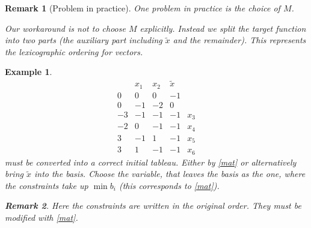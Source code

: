 \documentclass{article}
\numberwithin{lecref}{section}
\newtheorem*{Example}{Example}
\newtheorem*{Remark}{Remark}
\begin{document}
\begin{Remark}[Problem in practice]
	One problem in practice is the choice of $M$.

	Our workaround is not to choose $M$ explicitly. Instead we split the target function into two parts (the auxiliary part including $\tilde x$ and the remainder).
	This represents the lexicographic ordering for vectors.
\end{Remark}

\begin{Example}
	\[
		\begin{array}{c|cccr}
			& x_1 & x_2 & \tilde x & \\
			0 & 0 & 0 & -1 & \\
			0 & -1 & -2 & 0 & \\
		\hline
			-3 & -1 & -1 & -1 & x_3 \\
			-2 & 0 & -1 & -1 & x_4 \\
			3 & -1 & 1 & -1 & x_5 \\
			3 & 1 & -1 & -1 & x_6
		\end{array}
	\]
	must be converted into a correct initial tableau.
	Either by \eqref{mat} or alternatively bring $\tilde x$ into the basis.
	Choose the variable, that leaves the basis as the one, where the constraints take up $\min b_i$ (this corresponds to \eqref{mat}).

	\begin{Remark}
		Here the constraints are written in the original order.
		They must be modified with \eqref{mat}.
	\end{Remark}


\end{Example}
\end{document}
